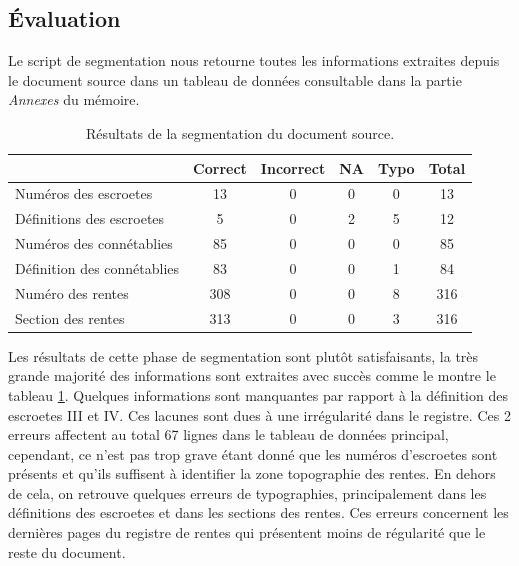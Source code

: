 \subsection{Évaluation}
Le script de segmentation nous retourne toutes les informations extraites depuis le document source dans un tableau de données consultable dans la partie \textit{Annexes} du mémoire. 
\begin{table}[ht]
    \centering
    \begin{tabular}{|l||c|c|c|c|c|}
        \hline		&	\textbf{Correct}	&	\textbf{Incorrect}	&	\textbf{NA}	&	\textbf{Typo}	&	\textbf{Total} \\
        \hline
        \hline	Numéros des escroetes	&	13	&	0	&	0	&	0	&	13\\
        \hline	Définitions des escroetes	&	5	&	0	&	2	&	5	&	12 \\
        \hline	Numéros des connétablies	&	85	&	0	&	0	&	0	&	85 \\
        \hline	Définition des connétablies	&	83	&	0	&	0	&	1	&	84 \\
        \hline	Numéro des rentes	&	308	&	0	&	0	&	8	&	316 \\
        \hline	Section des rentes	&	313	&	0	&	0	&	3	&	316 \\
        \hline
    \end{tabular}
    \caption{Résultats de la segmentation du document source.}
    \label{eval_seg}
\end{table}

Les résultats de cette phase de segmentation sont plutôt satisfaisants, la très grande majorité des informations sont extraites avec succès comme le montre le tableau \ref{eval_seg}. 
Quelques informations sont manquantes par rapport à la définition des escroetes III et IV. Ces lacunes sont dues à une irrégularité dans le registre. Ces 2 erreurs affectent au total 67 lignes dans le tableau de données principal, cependant, ce n'est pas trop grave étant donné que les numéros d'escroetes sont présents et qu'ils suffisent à identifier la zone topographie des rentes. En dehors de cela, on retrouve quelques erreurs de typographies, principalement dans les définitions des escroetes et dans les sections des rentes. Ces erreurs concernent les dernières pages du registre de rentes qui présentent moins de régularité que le reste du document.






